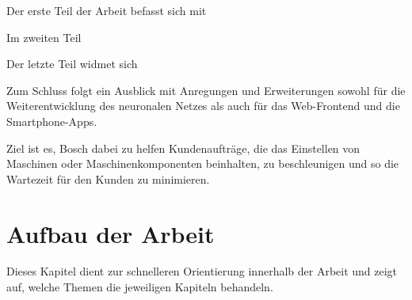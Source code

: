 Der erste Teil der Arbeit befasst sich mit

Im zweiten Teil

Der letzte Teil widmet sich

Zum Schluss folgt ein Ausblick mit Anregungen und Erweiterungen sowohl für die Weiterentwicklung des neuronalen Netzes
als auch für das Web-Frontend und die Smartphone-Apps.

Ziel ist es, Bosch dabei zu helfen Kundenaufträge, die das Einstellen von Maschinen oder Maschinenkomponenten beinhalten,
zu beschleunigen und so die Wartezeit für den Kunden zu minimieren.

\newpage

\section{Aufbau der Arbeit}
\label{sec:aufbauDerArbeit}
Dieses Kapitel dient zur schnelleren Orientierung innerhalb der Arbeit und zeigt auf, welche Themen die jeweiligen
Kapiteln behandeln.

